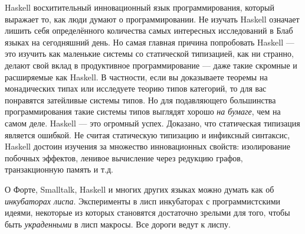 Haskell восхитительный инновационный язык программирования, который выражает то, как люди думают о программировании. Не изучать Haskell означает лишить себя определённого количества самых интересных исследований в Блаб языках на сегодняшний день. Но самая главная причина попробовать Haskell --- это изучить как маленькие системы со статической типизацией, как ни странно, делают свой вклад в продуктивное программирование --- даже такие скромные и расширяемые как Haskell. В частности, если вы доказываете теоремы на монадических типах или исследуете теорию типов категорий, то для вас понравятся затейливые системы типов. Но для подавляющего большинства программирования такие системы типов выглядят хорошо \emph{на бумаге}, чем на самом деле. Haskell --- это огромный успех. Доказано, что статическая типизация является ошибкой. Не считая статическую типизацию и инфиксный синтаксис, Haskell достоин изучения за множество инновационных свойств: изолирование побочных эффектов, ленивое вычисление через редукцию графов, транзакционную память и т.д.

О Форте, Smalltalk, Haskell и многих других языках можно думать как об \emph{инкубаторах лиспа}. Эксперименты в лисп инкубаторах с программистскими идеями, некоторые из которых становятся достаточно зрелыми для того, чтобы быть \emph{украденными} в лисп макросы. Все дороги ведут к лиспу.

